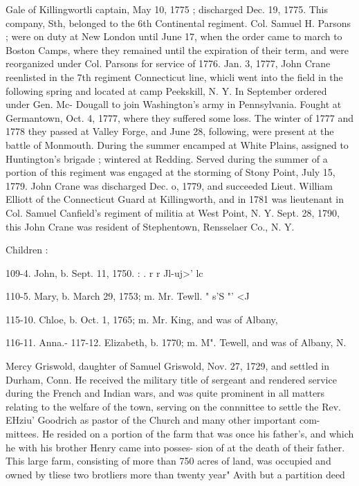 \documentclass[oneside]{book}
\begin{document}
Gale of Killingwortli captain, May 10, 1775 ; discharged Dec. 
19, 1775. This company, Sth, belonged to the 6th Continental 
regiment. Col. Samuel H. Parsons ; were on duty at New London 
until June 17, when the order came to march to Boston Camps, 
where they remained until the expiration of their term, and were 
reorganized under Col. Parsons for service of 1776. Jan. 3, 
1777, John Crane reenlisted in the 7th regiment Connecticut line, 
whicli went into the field in the following spring and located at 
camp Peekskill, N. Y. In September ordered under Gen. Mc- 
Dougall to join Washington's army in Pennsylvania. Fought at 
Germantown, Oct. 4, 1777, where they suffered some loss. The 
winter of 1777 and 1778 they passed at Valley Forge, and June 
28, following, were present at the battle of Monmouth. During 
the summer encamped at White Plains, assigned to Huntington's 
brigade ; wintered at Redding. Served during the summer of 
a portion of this regiment was engaged at the storming of Stony 
Point, July 15, 1779. John Crane was discharged Dec. o, 1779, 
and succeeded Lieut. William Elliott of the Connecticut Guard at 
Killingworth, and in 1781 was lieutenant in Col. Samuel Canfield's 
regiment of militia at West Point, N. Y. Sept. 28, 1790, this 
John Crane was resident of Stephentown, Rensselaer Co., N. Y. 

Children : 




109-4. John, b. Sept. 11, 1750. : . r r Jl-uj>' lc 

110-5. Mary, b. March 29, 1753; m. Mr. Tewll. " s'S "' <J 




115-10. Chloe, b. Oct. 1, 1765; m. Mr. King, and was of Albany, 

116-11. Anna.- 
117-12. Elizabeth, b. 1770; m. M". Tewell, and was of Albany, N. 


Mercy Griswold, daughter of Samuel Griswold, Nov. 27, 1729, 
and settled in Durham, Conn. He received the military title of 
sergeant and rendered service during the French and Indian wars, 
and was quite prominent in all matters relating to the welfare of 
the town, serving on the connnittee to settle the Rev. EHziu' 
Goodrich as pastor of the Church and many other important com- 
mittees. He resided on a portion of the farm that was once his 
father's, and which he with his brother Henry came into posses- 
sion of at the death of their father. This large farm, consisting 
of more than 750 acres of land, was occupied and owned by tliese 
two brotliers more than twenty year" Avith but a partition deed 
\end{document}
